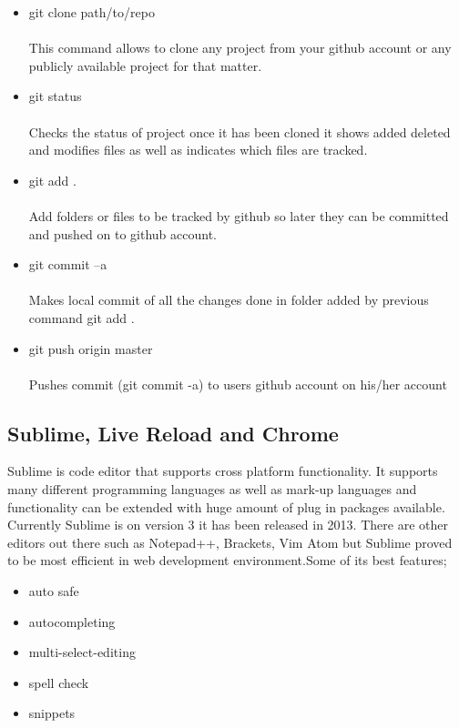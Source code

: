 \begin{itemize}
	
\item git clone path/to/repo \\
\\This command allows to clone any project from your github account or any publicly available project for that matter.

\item git status \\
\\Checks the status of project once it has been cloned it shows added deleted and modifies files as well as indicates which files are tracked.

\item git add . \\ 
\\Add folders or files to be tracked by github so later they can be committed and pushed on to github account.

\item git commit –a \\
\\Makes local commit of all the changes done in folder added by previous command git add .

\item git push origin master \\ 
\\ Pushes commit (git commit -a) to users github account on his/her account

\end{itemize}


\subsection{Sublime, Live Reload and Chrome}

Sublime is code editor that supports cross platform functionality. It supports many different programming languages as well as mark-up languages and functionality can be extended with huge amount of plug in packages available. Currently Sublime is on version 3 it has been released in 2013.
There are other editors out there such as Notepad++, Brackets, Vim Atom but Sublime proved to be most efficient in web development environment.Some of its best features;

\begin{itemize}
	
	\item auto safe 
	\item autocompleting 
	\item multi-select-editing 
	\item spell check 
	\item snippets  

\end{itemize}





